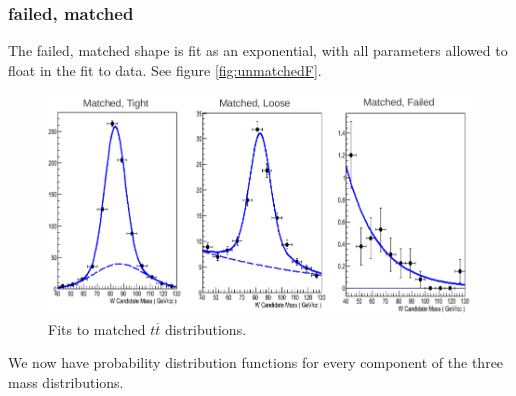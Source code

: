 \subsubsection*{failed, matched}
The failed, matched shape is fit as an exponential, with all parameters allowed to float in the fit to data. See figure \ref{fig:unmatchedF}.
\begin{figure}[ht!]
\centering
\includegraphics[scale=0.5]{figs/WtagSF/matched_fits.png}
\caption{Fits to matched $t\overline{t}$ distributions.}\label{fig:matchedF}
\end{figure}
We now have probability distribution functions for every component of the three mass distributions.
